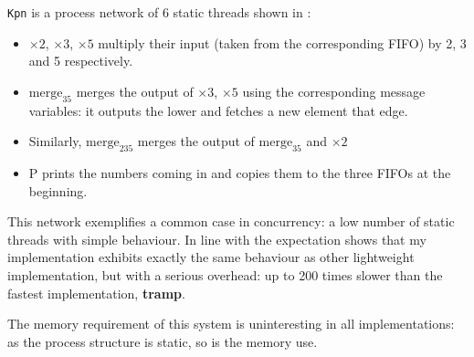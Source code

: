 \documentclass[12pt,twoside,notitlepage]{report}
\theoremstyle{plain}%
\theoremstyle{definition}
\theoremstyle{remark}
\begin{document}
\verb|Kpn| is a process network of 6 static threads shown in :
\begin{itemize}
\item{$ \times 2 $, $ \times 3 $, $ \times 5 $ multiply their input (taken from the corresponding FIFO) by 2, 3 and 5 respectively.}
\item{$ \text{merge}_{35} $ merges the output of $ \times 3 $, $ \times 5 $ using the corresponding message variables: it outputs the lower and fetches a new element that edge.}
\item{Similarly, $ \text{merge}_{235} $ merges the output of $ \text{merge}_{35} $ and $ \times 2 $}
\item{P prints the numbers coming in and copies them to the three FIFOs at the beginning.}
\end{itemize}
This network exemplifies a common case in concurrency: a low number of static threads with simple behaviour. In line with the expectation  shows that my implementation exhibits exactly the same behaviour as other lightweight implementation, but with a serious overhead: up to 200 times slower than the fastest implementation, \textbf{tramp}.  

The memory requirement of this system is uninteresting in all implementations: as the process structure is static, so is the memory use.
\end{document}
